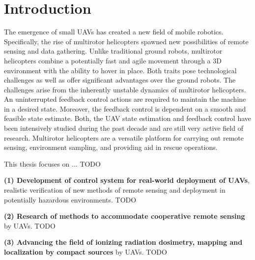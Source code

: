\documentclass[a4paper,11pt,titlepage,twoside]{book}
\newcommand{\todo}[1]{{\color{red} TODO {#1}}}
\newcommand{\chapternoclear}[1]{
  \begingroup
  \let\cleardoublepage\clearpage
  \chapter{#1}
  \endgroup
}
\newcommand{\conditionalClearPage}{
  \ifdefined\printversion
  \clearemptydoublepage
  \else
  \newpage{}
  \clearpage
  \fi
}
\begin{document}


\conditionalClearPage


\conditionalClearPage


\conditionalClearPage


\pagestyle{fancy}

\conditionalClearPage
\tableofcontents



\chapternoclear{Introduction}

The emergence of small \acp{UAV} has created a new field of mobile robotics.
Specifically, the rise of multirotor helicopters spawned new possibilities of remote sensing and data gathering.
Unlike traditional ground robots, multirotor helicopters combine a potentially fast and agile movement through a 3D environment with the ability to hover in place.
Both traits pose technological challenges as well as offer significant advantages over the ground robots.
The challenges arise from the inherently unstable dynamics of multirotor helicopters.
An uninterrupted feedback control actions are required to maintain the machine in a desired state.
Moreover, the feedback control is dependent on a smooth and feasible state estimate.
Both, the \ac{UAV} state estimation and feedback control have been intensively studied during the past decade and are still very active field of research.
Multirotor helicopters are a versatile platform for carrying out remote sensing, environment sampling, and providing aid in rescue operations.

This thesis focuses on ... \todo{}

\textbf{(1) Development of control system for real-world deployment of \acp{UAV}}, realistic verification of new methods of remote sensing and deployment in potentially hazardous environments.
\todo{}

\textbf{(2) Research of methods to accommodate cooperative remote sensing} by \aclp{UAV}.
\todo{}

\textbf{(3) Advancing the field of ionizing radiation dosimetry, mapping and localization by compact sources} by \aclp{UAV}.
\todo{}



\end{document}
